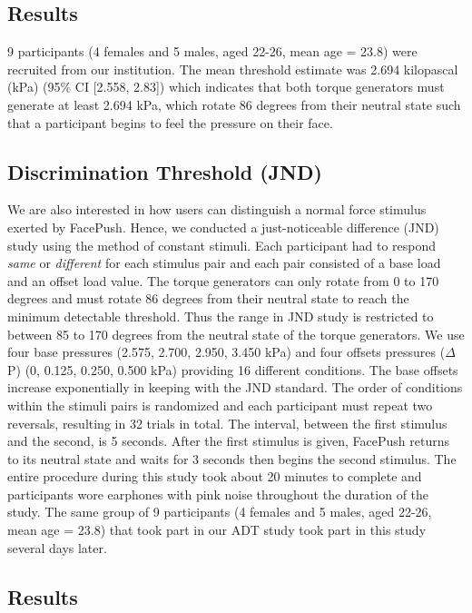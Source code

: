 \subsection{Results }
9 participants (4 females and 5 males, aged 22-26, mean age = 23.8) were recruited from our institution. The mean threshold estimate was 2.694 kilopascal (kPa) (95\% CI [2.558, 2.83]) which indicates that both torque generators must generate at least 2.694 kPa, which rotate 86 degrees from their neutral state such that a participant begins to feel the pressure on their face.

\subsection{Discrimination Threshold (JND) }
We are also interested in how users can distinguish a normal force stimulus exerted by FacePush. Hence, we conducted a just-noticeable difference (JND) study using the method of constant stimuli. Each participant had to respond \textit{same} or \textit{different} for each stimulus pair and each pair consisted of a base load and an offset load value. The torque generators can only rotate from 0 to 170 degrees and must rotate 86 degrees from their neutral state to reach the minimum detectable threshold. Thus the range in JND study is restricted to between 85 to 170 degrees from the neutral state of the torque generators. We use four base pressures (2.575, 2.700, 2.950, 3.450 kPa) and four offsets pressures ($\Delta$P) (0, 0.125, 0.250, 0.500 kPa) providing 16 different conditions. The base offsets increase exponentially in keeping with the JND standard. The order of conditions within the stimuli pairs is randomized and each participant must repeat two reversals, resulting in 32 trials in total. The interval, between the first stimulus and the second, is 5 seconds. After the first stimulus is given, FacePush returns to its neutral state and waits for 3 seconds then begins the second stimulus. The entire procedure during this study took about 20 minutes to complete and participants wore earphones with pink noise throughout the duration of the study. The same group of 9 participants (4 females and 5 males, aged 22-26, mean age = 23.8) that took part in our ADT study took part in this study several days later.

\subsection{Results }

